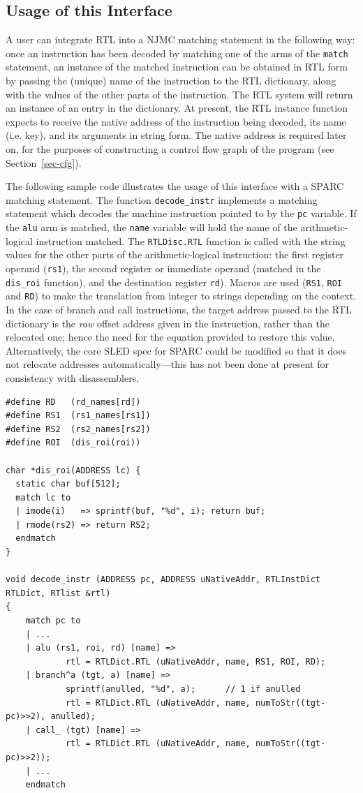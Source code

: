 \subsection{Usage of this Interface}
\label{sec-usageRTL}
A user can integrate RTL into a NJMC matching statement in
the following way: once an instruction has been decoded 
by matching one of the arms of the \texttt{match} statement, 
an instance of the matched instruction can be obtained in 
RTL form by passing the (unique) name of the instruction to
the RTL dictionary, along with the values of the other parts
of the instruction.  The RTL system will return an instance
of an entry in the dictionary. 
At present, the RTL instance function expects to receive 
the native address of the instruction being decoded, its name 
(i.e. key), and its arguments in string form.  The native 
address is required later on, for the purposes of constructing
a control flow graph of the program (see Section~\ref{sec-cfg}).

The following sample code illustrates the usage of this interface
with a SPARC matching statement.
The function \texttt{decode\_instr} implements a matching statement
which decodes the machine instruction pointed to by the \texttt{pc}
variable.  If the \texttt{alu} arm is matched, the \texttt{name} 
variable will hold the name of the arithmetic-logical instruction
matched.  The \texttt{RTLDisc.RTL} function is called with the
string values for the other parts of the arithmetic-logical 
instruction: the first register operand (\texttt{rs1}), the 
second register or immediate operand (matched in the \texttt{dis\_roi}
function), and the destination register \texttt{rd}).  Macros
are used (\texttt{RS1}, \texttt{ROI} and \texttt{RD}) to make
the translation from integer to strings depending on the context.
In the case of branch and call instructions, the target address passed
to the RTL dictionary is the \emph{raw} offset address given in the
instruction, rather than the relocated one; hence the need for the
equation provided to restore this value.  Alternatively, the 
core SLED spec for SPARC could be modified so that it does not 
relocate addresses automatically---this has not been done at 
present for consistency with disassemblers.

{\small
\begin{verbatim}
#define RD   (rd_names[rd])
#define RS1  (rs1_names[rs1])
#define RS2  (rs2_names[rs2])
#define ROI  (dis_roi(roi))

char *dis_roi(ADDRESS lc) {
  static char buf[512];
  match lc to
  | imode(i)   => sprintf(buf, "%d", i); return buf;
  | rmode(rs2) => return RS2;
  endmatch
}

void decode_instr (ADDRESS pc, ADDRESS uNativeAddr, RTLInstDict RTLDict, RTlist &rtl)
{
    match pc to
    | ...
    | alu (rs1, roi, rd) [name] => 
            rtl = RTLDict.RTL (uNativeAddr, name, RS1, ROI, RD);
    | branch^a (tgt, a) [name] => 
            sprintf(anulled, "%d", a);      // 1 if anulled
            rtl = RTLDict.RTL (uNativeAddr, name, numToStr((tgt-pc)>>2), anulled);
    | call_ (tgt) [name] => 
            rtl = RTLDict.RTL (uNativeAddr, name, numToStr((tgt-pc)>>2)); 
    | ...
    endmatch
\end{verbatim}  
}

